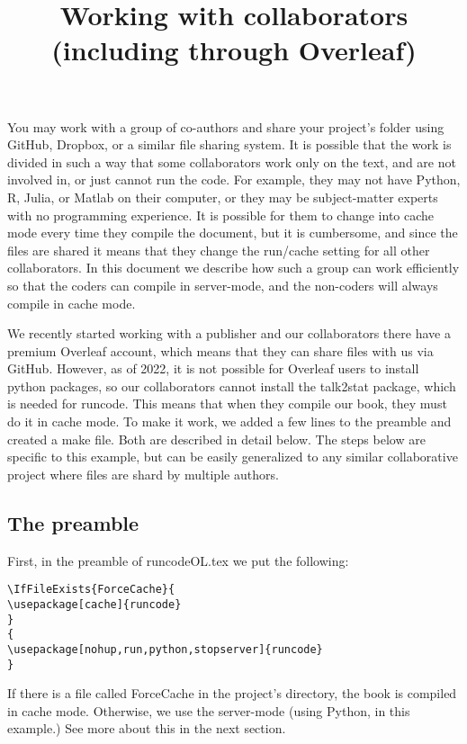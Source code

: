 \documentclass[12pt]{article}
\begin{document}
\title{Working with collaborators (including through Overleaf)}
\maketitle

You may work with a group of co-authors and share your project's folder using GitHub, Dropbox, or a similar file sharing system.
It is possible that the work is divided in such a way that some collaborators work only on the text, and are not involved in, or just cannot run the code. For example, they may not have Python, R, Julia, or Matlab on their computer, or they may be subject-matter experts with no programming experience.
It is possible for them to change into cache mode every time they compile the document, but it is cumbersome, and since the files are shared it means that they change the run/cache setting for all other collaborators. In this document we describe how such a group can work efficiently so that the coders can compile in server-mode, and the non-coders will always compile in cache mode.

We recently started working with a publisher and our collaborators there have a premium Overleaf account, which means that they can share files with us via GitHub. However, as of 2022, it is not possible for Overleaf users to install python packages, so our collaborators cannot install the talk2stat package, which is needed for runcode. This means that when they compile our book, they must do it in cache mode. To make it work, we added a few lines to the preamble and created a make file. Both are described in detail below. The steps below are specific to this example, but can be easily generalized to any similar collaborative project where files are shard by multiple authors. 

\subsection*{The preamble}

First, in the preamble of runcodeOL.tex we put the following:
\begin{tcolorbox}
\begin{Verbatim}
\IfFileExists{ForceCache}{
\usepackage[cache]{runcode} 
}
{
\usepackage[nohup,run,python,stopserver]{runcode}
}
\end{Verbatim}
\end{tcolorbox}

If there is a file called ForceCache in the project's directory, the book is compiled in cache mode. Otherwise, we use the server-mode (using Python, in this example.) See more about this in the next section.
\end{document}
